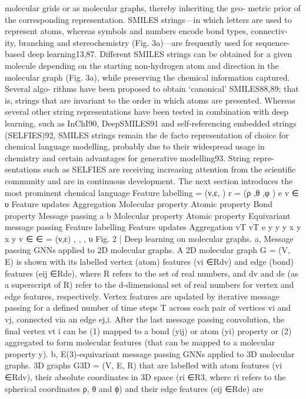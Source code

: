 molecular grids or as molecular graphs, thereby inheriting the geo-
metric prior of the corresponding representation.
SMILES strings—in which letters are used to represent atoms,
whereas symbols and numbers encode bond types, connectiv-
ity, branching and stereochemistry (Fig. 3a)—are frequently used
for sequence-based deep learning13,87. Different SMILES strings
can be obtained for a given molecule depending on the starting
non-hydrogen atom and direction in the molecular graph (Fig. 3a),
while preserving the chemical information captured. Several algo-
rithms have been proposed to obtain ‘canonical’ SMILES88,89; that is,
strings that are invariant to the order in which atoms are presented.
Whereas several other string representations have been tested
in combination with deep learning, such as InChI90, DeepSMILES91
and self-referencing embedded strings (SELFIES)92, SMILES strings
remain the de facto representation of choice for chemical language
modelling, probably due to their widespread usage in chemistry
and certain advantages for generative modelling93. String repre-
sentations such as SELFIES are receiving increasing attention from
the scientific community and are in continuous development. The
next section introduces the most prominent chemical language
Feature labelling
= (ν,ε,   )
r  = (ρ ,θ ,φ )
e
v  ∈       υ
Feature updates
Aggregation
Molecular property
Atomic property
Bond property
Message passing
a
b
Molecular property
Atomic property
Equivariant message passing
Feature labelling
Feature updates
Aggregation
vT
vT
e
y
y
y
x
y
x
y
v  ∈
∈
= (ν,ε)
,
,
,
υ
Fig. 2 | Deep learning on molecular graphs. a, Message passing GNNs applied to 2D molecular graphs. A 2D molecular graph G = (V, E) is shown with its
labelled vertex (atom) features (vi ∈Rdv) and edge (bond) features (eij ∈Rde), where R refers to the set of real numbers, and dv and de (as a superscript
of R) refer to the d-dimensional set of real numbers for vertex and edge features, respectively. Vertex features are updated by iterative message passing
for a defined number of time steps T across each pair of vertices vi and vj, connected via an edge ej,i. After the last message passing convolution, the
final vertex vt
i can be (1) mapped to a bond (yij) or atom (yi) property or (2) aggregated to form molecular features (that can be mapped to a molecular
property y). b, E(3)-equivariant message passing GNNs applied to 3D molecular graphs. 3D graphs G3D = (V, E, R) that are labelled with atom features
(vi ∈Rdv), their absolute coordinates in 3D space (ri ∈R3, where ri refers to the spherical coordinates ρ, θ and ϕ) and their edge features (eij ∈Rde) are
